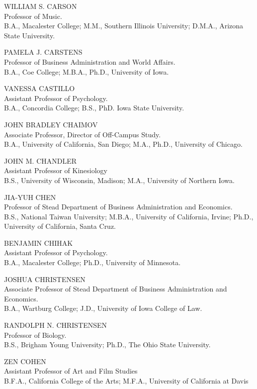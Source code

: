 \documentclass[
  letterpaper,
]{scrbook}
\begin{document}
WILLIAM S. CARSON\\
Professor of Music.\\
B.A., Macalester College; M.M., Southern Illinois University; D.M.A.,
Arizona State University.

PAMELA J. CARSTENS\\
Professor of Business Administration and World Affairs.\\
B.A., Coe College; M.B.A., Ph.D., University of Iowa.

VANESSA CASTILLO\\
Assistant Professor of Psychology.\\
B.A., Concordia College; B.S., PhD. Iowa State University.

JOHN BRADLEY CHAIMOV\\
Associate Professor, Director of Off-Campus Study.\\
B.A., University of California, San Diego; M.A., Ph.D., University of
Chicago.

JOHN M. CHANDLER\\
Assistant Professor of Kinesiology\\
B.S., University of Wisconsin, Madison; M.A., University of Northern
Iowa.

JIA-YUH CHEN\\
Professor of Stead Department of Business Administration and
Economics.\\
B.S., National Taiwan University; M.B.A., University of California,
Irvine; Ph.D., University of California, Santa Cruz.

BENJAMIN CHIHAK\\
Assistant Professor of Psychology.\\
B.A., Macalester College; Ph.D., University of Minnesota.

JOSHUA CHRISTENSEN\\
Associate Professor of Stead Department of Business Administration and
Economics.\\
B.A., Wartburg College; J.D., University of Iowa College of Law.

RANDOLPH N. CHRISTENSEN\\
Professor of Biology.\\
B.S., Brigham Young University; Ph.D., The Ohio State University.

ZEN COHEN\\
Assistant Professor of Art and Film Studies\\
B.F.A., California College of the Arts; M.F.A., University of California
at Davis
\end{document}
